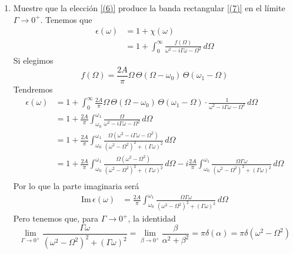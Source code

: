 \documentclass[]{article}
\numberwithin{equation}{section}
\begin{document}
\begin{enumerate}
\begin{enumerate}
		\item[2.] Muestre que la elección \ref{(6)} produce la banda rectangular \ref{(7)} en el límite $\Gamma \to 0^{+}$.
		\resp Tenemos que
		\begin{align*}
			\epsilon(\omega) &= 1 + \chi(\omega)\\
			&= 1 + \int_{0}^{\infty} \frac{f(\Omega)}{\omega^2 - i \Gamma \omega - \Omega^2} \, d\Omega
		\end{align*}
		Si elegimos
		\begin{equation*}
			f(\Omega) = \frac{2 A}{\pi} \Omega \, \Theta(\Omega - \omega_0) \, \Theta( \omega_1 - \Omega)
		\end{equation*}
		Tendremos
		\begin{align*}
			\epsilon(\omega) &= 1 + \int_{0}^{\infty} \frac{2 A}{\pi} \Omega \, \Theta(\Omega - \omega_0) \, \Theta( \omega_1 - \Omega) \cdot \frac{1}{\omega^2 - i \Gamma \omega - \Omega^2} \, d\Omega\\
			&= 1 + \frac{2 A}{\pi} \int_{\omega_0}^{\omega_1} \frac{\Omega }{\omega^2 - i \Gamma \omega - \Omega^2} \, d\Omega\\
			&= 1 + \frac{2 A}{\pi} \int_{\omega_0}^{\omega_1} \frac{\Omega \left(\omega^2 - i \Gamma \omega - \Omega^2\right) }{\left(\omega^2 - \Omega^2\right)^2 + \left(\Gamma \omega\right)^2} \, d\Omega\\
			&= 1 + \frac{2 A}{\pi} \int_{\omega_0}^{\omega_1} \frac{\Omega \left(\omega^2 - \Omega^2\right) }{\left(\omega^2 - \Omega^2\right)^2 + \left(\Gamma \omega\right)^2} \, d\Omega - i \frac{2 A}{\pi} \int_{\omega_0}^{\omega_1} \frac{\Omega \Gamma \omega }{\left(\omega^2 - \Omega^2\right)^2 + \left(\Gamma \omega\right)^2} \, d\Omega \\
		\end{align*}
		Por lo que la parte imaginaria será
		\begin{align*}
			\mathrm{Im} \, \epsilon(\omega) &= \frac{2 A}{\pi} \int_{\omega_0}^{\omega_1} \frac{\Omega \Gamma \omega }{\left(\omega^2 - \Omega^2\right)^2 + \left(\Gamma \omega\right)^2} \, d\Omega
		\end{align*}
		Pero tenemos que, para $\Gamma \to 0^+$, la identidad
		\begin{equation}
			\lim_{\Gamma \to 0^+} \frac{\Gamma \omega }{\left(\omega^2 - \Omega^2\right)^2 + \left(\Gamma \omega\right)^2} = \lim_{\beta \to 0^+} \frac{\beta}{\alpha^2 + \beta^2} = \pi \delta\left(\alpha\right) = \pi \delta\left(\omega^2 - \Omega^2\right)

\end{equation}
\end{enumerate}
\end{enumerate}
\end{document}
